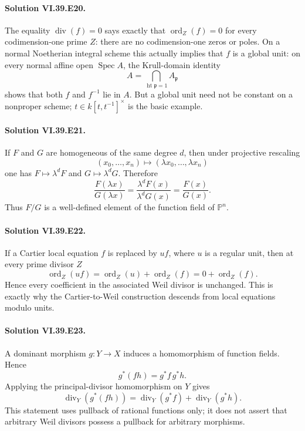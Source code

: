 \paragraph{Solution VI.39.E20.}\label{sol:vi39-e20}
The equality \(\operatorname{div}(f)=0\) says exactly that \(\operatorname{ord}_Z(f)=0\) for every codimension-one prime \(Z\): there are no codimension-one zeros or poles.  On a normal Noetherian integral scheme this actually implies that \(f\) is a global unit: on every normal affine open \(\operatorname{Spec}A\), the Krull-domain identity
\[
 A=\bigcap_{\operatorname{ht}\mathfrak p=1}A_{\mathfrak p}
\]
shows that both \(f\) and \(f^{-1}\) lie in \(A\).  But a global unit need not be constant on a nonproper scheme; \(t\in k[t,t^{-1}]^\times\) is the basic example.

\paragraph{Solution VI.39.E21.}\label{sol:vi39-e21}
If \(F\) and \(G\) are homogeneous of the same degree \(d\), then under projective rescaling
\[
 (x_0,\ldots,x_n)\longmapsto(\lambda x_0,\ldots,\lambda x_n)
\]
one has \(F\mapsto\lambda^dF\) and \(G\mapsto\lambda^dG\).  Therefore
\[
 \frac{F(\lambda x)}{G(\lambda x)}
 =\frac{\lambda^dF(x)}{\lambda^dG(x)}
 =\frac{F(x)}{G(x)}.
\]
Thus \(F/G\) is a well-defined element of the function field of \(\mathbb P^n\).

\paragraph{Solution VI.39.E22.}\label{sol:vi39-e22}
If a Cartier local equation \(f\) is replaced by \(uf\), where \(u\) is a regular unit, then at every prime divisor \(Z\)
\[
 \operatorname{ord}_Z(uf)
 =\operatorname{ord}_Z(u)+\operatorname{ord}_Z(f)
 =0+\operatorname{ord}_Z(f).
\]
Hence every coefficient in the associated Weil divisor is unchanged.  This is exactly why the Cartier-to-Weil construction descends from local equations modulo units.

\paragraph{Solution VI.39.E23.}\label{sol:vi39-e23}
A dominant morphism \(g:Y\to X\) induces a homomorphism of function fields.  Hence
\[
 g^*(fh)=g^*f\,g^*h.
\]
Applying the principal-divisor homomorphism on \(Y\) gives
\[
 \operatorname{div}_Y(g^*(fh))
 =\operatorname{div}_Y(g^*f)+\operatorname{div}_Y(g^*h).
\]
This statement uses pullback of rational functions only; it does not assert that arbitrary Weil divisors possess a pullback for arbitrary morphisms.

